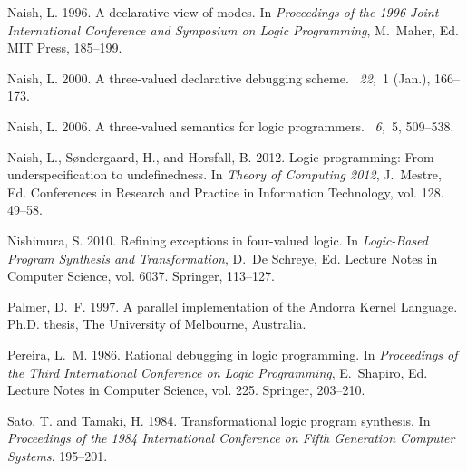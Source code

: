 \documentclass{tlp}
\begin{document}
\begin{thebibliography}{}
{\sc Naish, L.} 1996.
\newblock A declarative view of modes.
\newblock In {\em Proceedings of the 1996 Joint International Conference and
  Symposium on Logic Programming}, {M.~Maher}, Ed. MIT Press, 185--199.

{\sc Naish, L.} 2000.
\newblock A three-valued declarative debugging scheme.
~{\em 22,\/}~1
  (Jan.), 166--173.

{\sc Naish, L.} 2006.
\newblock A three-valued semantics for logic programmers.
~{\em 6,\/}~5,
  509--538.

{\sc Naish, L.}, {\sc S{\o}ndergaard, H.}, {\sc and} {\sc Horsfall, B.} 2012.
\newblock Logic programming: From underspecification to undefinedness.
\newblock In {\em Theory of Computing 2012}, {J.~Mestre}, Ed. Conferences in
  Research and Practice in Information Technology, vol. 128. 49--58.

{\sc Nishimura, S.} 2010.
\newblock Refining exceptions in four-valued logic.
\newblock In {\em Logic-Based Program Synthesis and Transformation}, {D.~{De
  Schreye}}, Ed. Lecture Notes in Computer Science, vol. 6037. Springer,
  113--127.

{\sc Palmer, D.~F.} 1997.
\newblock A parallel implementation of the {Andorra Kernel Language}.
\newblock Ph.D. thesis, The University of Melbourne, Australia.

{\sc Pereira, L.~M.} 1986.
\newblock Rational debugging in logic programming.
\newblock In {\em Proceedings of the Third International Conference on Logic
  Programming}, {E.~Shapiro}, Ed. Lecture Notes in Computer Science, vol. 225.
  Springer, 203--210.

{\sc Sato, T.} {\sc and} {\sc Tamaki, H.} 1984.
\newblock Transformational logic program synthesis.
\newblock In {\em Proceedings of the 1984 International Conference on Fifth
  Generation Computer Systems}. 195--201.


\end{thebibliography}
\end{document}
